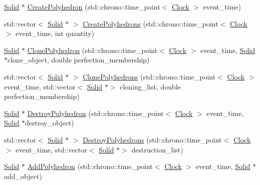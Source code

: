 \begin{DoxyCompactItemize}
\item 
\mbox{\hyperlink{class_solid}{Solid}} $\ast$ \mbox{\hyperlink{class_solid_a231b2c469aab60b092fcc3a9525e5c80}{Create\+Polyhedron}} (std\+::chrono\+::time\+\_\+point$<$ \mbox{\hyperlink{universe_8h_a0ef8d951d1ca5ab3cfaf7ab4c7a6fd80}{Clock}} $>$ event\+\_\+time)
\item 
std\+::vector$<$ \mbox{\hyperlink{class_solid}{Solid}} $\ast$ $>$ \mbox{\hyperlink{class_solid_a40b2ea07e384aff138ba139c3c84f525}{Create\+Polyhedrons}} (std\+::chrono\+::time\+\_\+point$<$ \mbox{\hyperlink{universe_8h_a0ef8d951d1ca5ab3cfaf7ab4c7a6fd80}{Clock}} $>$ event\+\_\+time, int quantity)
\item 
\mbox{\hyperlink{class_solid}{Solid}} $\ast$ \mbox{\hyperlink{class_solid_ae83094e9c002a7574db242ed0bff6288}{Clone\+Polyhedron}} (std\+::chrono\+::time\+\_\+point$<$ \mbox{\hyperlink{universe_8h_a0ef8d951d1ca5ab3cfaf7ab4c7a6fd80}{Clock}} $>$ event\+\_\+time, \mbox{\hyperlink{class_solid}{Solid}} $\ast$clone\+\_\+object, double perfection\+\_\+membership)
\item 
std\+::vector$<$ \mbox{\hyperlink{class_solid}{Solid}} $\ast$ $>$ \mbox{\hyperlink{class_solid_a1e650b6d8437acfaf7b9384b885d77bf}{Clone\+Polyhedrons}} (std\+::chrono\+::time\+\_\+point$<$ \mbox{\hyperlink{universe_8h_a0ef8d951d1ca5ab3cfaf7ab4c7a6fd80}{Clock}} $>$ event\+\_\+time, std\+::vector$<$ \mbox{\hyperlink{class_solid}{Solid}} $\ast$$>$ cloning\+\_\+list, double perfection\+\_\+membership)
\item 
\mbox{\hyperlink{class_solid}{Solid}} $\ast$ \mbox{\hyperlink{class_solid_a0841900d8ef4b82292ac027c4852b59b}{Destroy\+Polyhedron}} (std\+::chrono\+::time\+\_\+point$<$ \mbox{\hyperlink{universe_8h_a0ef8d951d1ca5ab3cfaf7ab4c7a6fd80}{Clock}} $>$ event\+\_\+time, \mbox{\hyperlink{class_solid}{Solid}} $\ast$destroy\+\_\+object)
\item 
std\+::vector$<$ \mbox{\hyperlink{class_solid}{Solid}} $\ast$ $>$ \mbox{\hyperlink{class_solid_ab1652ee511ed51bbe6a0a3b1854b7974}{Destroy\+Polyhedrons}} (std\+::chrono\+::time\+\_\+point$<$ \mbox{\hyperlink{universe_8h_a0ef8d951d1ca5ab3cfaf7ab4c7a6fd80}{Clock}} $>$ event\+\_\+time, std\+::vector$<$ \mbox{\hyperlink{class_solid}{Solid}} $\ast$$>$ destruction\+\_\+list)
\item 
\mbox{\hyperlink{class_solid}{Solid}} $\ast$ \mbox{\hyperlink{class_solid_a87a3b588f931ff20f09a5d46f6cb7907}{Add\+Polyhedron}} (std\+::chrono\+::time\+\_\+point$<$ \mbox{\hyperlink{universe_8h_a0ef8d951d1ca5ab3cfaf7ab4c7a6fd80}{Clock}} $>$ event\+\_\+time, \mbox{\hyperlink{class_solid}{Solid}} $\ast$add\+\_\+object)

\end{DoxyCompactItemize}
